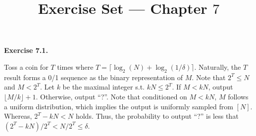 \documentclass[a4paper]{article}
\title{Exercise Set --- Chapter $7$}
\date{}
\newenvironment{exercise}[1]{
	\par
	\noindent\textbf{Exercise #1.}\quad
}{
	\par
	\bigskip
}
\begin{document}
    \maketitle

    \begin{exercise}{7.1}
        Toss a coin for $T$ times where $T = \lceil\log_2(N) + \log_2(1/\delta)\rceil$. Naturally, the $T$ result forms a 0/1 sequence as the binary representation of $M$. Note that $2^T \leq N$ and $M < 2^T$. Let $k$ be the maximal integer s.t. $kN \leq 2^T$. If $M < kN$, output $\lfloor M/k\rfloor + 1$. Otherwise, output ``?''. Note that conditioned on $M < kN$, $M$ follows a uniform distribution, which implies the output is uniformly sampled from $[N]$. Whereas, $2^T - kN < N$ holds. Thus, the probability to output ``?'' is less that $(2^T - kN)/2^T < N/2^T \leq \delta$.
    \end{exercise}
\end{document}
